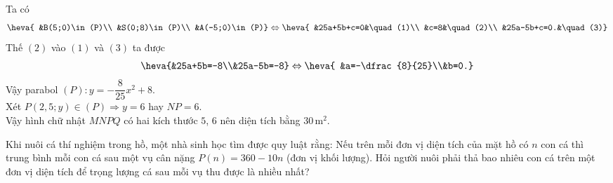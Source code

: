 \begin{ex}
{Ta có
\[\heva{
&B(5;0)\in (P)\\
&S(0;8)\in (P)\\
&A(-5;0)\in (P)}
\Leftrightarrow\heva{
&25a+5b+c=0&\quad(1)\\
&c=8&\quad(2)\\
&25a-5b+c=0.&\quad(3)}\]
Thế $(2)$ vào $(1)$ và $(3)$ ta được
\[\heva{&25a+5b=-8\\&25a-5b=-8}
\Leftrightarrow\heva{
&a=-\dfrac{8}{25}\\&b=0.}\]
Vậy parabol $(P)\colon y=-\dfrac{8}{25}x^2+8$.\\
Xét $P(2{,}5;y)\in (P)\Rightarrow y=6$ hay $NP=6$.\\
Vậy hình chữ nhật $MNPQ$ có hai kích thước $5$, $6$ nên diện tích bằng $30$\,m$^2$.
}
\end{ex}

\begin{ex}%
Khi nuôi cá thí nghiệm trong hồ, một nhà sinh học tìm được quy luật rằng: Nếu trên mỗi đơn vị diện tích của mặt hồ có $n$ con cá thì trung bình mỗi con cá sau một vụ cân nặng $P(n)=360-10n$ (đơn vị khối lượng). Hỏi người nuôi phải thả bao nhiêu con cá trên một đơn vị diện tích để trọng lượng cá sau mỗi vụ thu được là nhiều nhất?
\end{ex}

